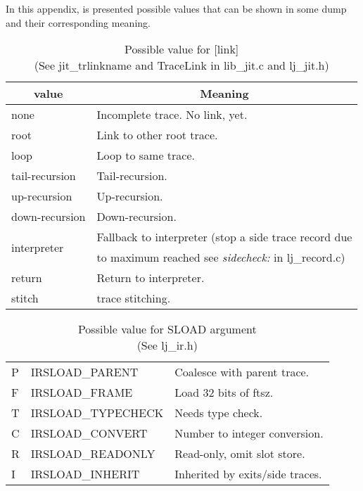 
In this appendix, is presented possible values that can be shown in some dump
and their corresponding meaning.

\begin{table}[H]
\centering
\caption{
  Possible value for [link] \\(See jit\_trlinkname and TraceLink in lib\_jit.c
  and lj\_jit.h)
}
\label{tab:dump-link}
\begin{tabular}{|l|l|}
\hline
\multicolumn{1}{|c|}{value} & \multicolumn{1}{c|}{Meaning}\\\hline
none                        & Incomplete trace. No link, yet.\\
root                        & Link to other root trace.\\
loop                        & Loop to same trace.\\
tail-recursion              & Tail-recursion.\\
up-recursion                & Up-recursion.\\
down-recursion              & Down-recursion.\\\hline
\multirow{2}{*}{interpreter}& Fallback to interpreter (stop a side trace record due\\
& to maximum reached see \emph{sidecheck:} in lj\_record.c)\\\hline
return                      & Return to interpreter.\\
stitch                      & trace stitching.\\\hline
\end{tabular}
\end{table}

\begin{table}[H]
\centering
\caption{
  Possible value for SLOAD argument \\(See lj\_ir.h)
}
\label{tab:dump-sload}
\begin{tabular}{|l|l|l|}
\hline
P & IRSLOAD\_PARENT    & Coalesce with parent trace.\\
F & IRSLOAD\_FRAME     & Load 32 bits of ftsz.\\
T & IRSLOAD\_TYPECHECK & Needs type check.\\
C & IRSLOAD\_CONVERT   & Number to integer conversion.\\
R & IRSLOAD\_READONLY  & Read-only, omit slot store.\\
I & IRSLOAD\_INHERIT   & Inherited by exits/side traces.\\
\hline
\end{tabular}
\end{table}

